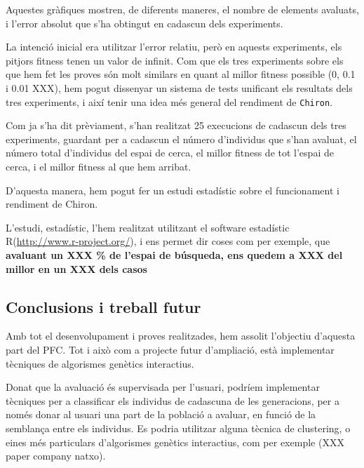 	Aquestes gràfiques mostren, de diferents maneres, el nombre de elements
	avaluats, i l'error absolut que s'ha obtingut en cadascun dels experiments.

	La intenció inicial era utilitzar l'error relatiu, però en aquests
	experiments, els pitjors fitness tenen un valor de infinit.  Com que els
	tres experiments sobre els que hem fet les proves són molt similars en quant
	al millor fitness possible (0, 0.1 i 0.01 XXX), hem pogut dissenyar un
	sistema de tests unificant els resultats dels tres experiments, i així tenir
	una idea més general del rendiment de \texttt{Chiron}.

	Com ja s'ha dit prèviament, s'han  realitzat 25 execucions de cadascun dels
	tres experiments, guardant per a cadascun el número d'individus que s'han
	avaluat, el número total d'individus del espai de cerca, el millor fitness
	de tot l'espai de cerca, i el millor fitness al que hem arribat.

	D'aquesta manera, hem pogut fer un estudi estadístic sobre el funcionament i
	rendiment de Chiron.

	L'estudi, estadístic, l'hem realitzat utilitzant el software estadístic
	R(\url{http://www.r-project.org/}), i ens permet dir coses com per exemple, que \textbf{avaluant un XXX
	\% de l'espai de búsqueda, ens quedem a XXX del millor en un XXX dels casos}


\subsection{Conclusions i treball futur} %
	\label{sub:CConclusions i treball futur}

	Amb tot el desenvolupament i proves realitzades, hem assolit l'objectiu
	d'aquesta part del PFC.  Tot i això com a projecte futur
	d'ampliació, està implementar tècniques de algorismes genètics interactius.

	Donat que la avaluació és supervisada per l'usuari, podríem implementar
	tècniques per a classificar els individus de cadascuna de les generacions,
	per a només donar al usuari una part de la població a avaluar, en funció de
	la semblança entre els individus.  Es podria utilitzar alguna tècnica de
	clustering, o eines més particulars d'algorismes genètics interactius, com
	per exemple (XXX paper company natxo).

%
